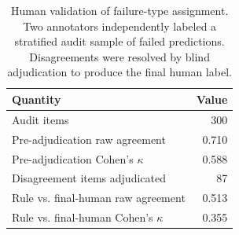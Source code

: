 \begin{table}[t]
\centering
\small
\caption{Human validation of failure-type assignment. Two annotators independently labeled a stratified audit sample of failed predictions. Disagreements were resolved by blind adjudication to produce the final human label.}
\label{tab:failure_taxonomy_human_validation}
\begin{tabular}{lr}
\toprule
Quantity & Value \\
\midrule
Audit items & 300 \\
Pre-adjudication raw agreement & 0.710 \\
Pre-adjudication Cohen's $\kappa$ & 0.588 \\
Disagreement items adjudicated & 87 \\
Rule vs. final-human raw agreement & 0.513 \\
Rule vs. final-human Cohen's $\kappa$ & 0.355 \\
\bottomrule
\end{tabular}
\end{table}